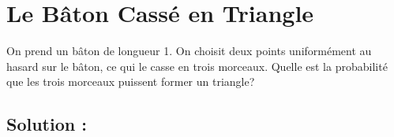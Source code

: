 












\section{Le Bâton Cassé en Triangle}

\begin{exerciseBox}
On prend un bâton de longueur 1. On choisit deux points uniformément au hasard sur le bâton, ce qui le casse en trois morceaux. Quelle est la probabilité que les trois morceaux puissent former un triangle?
\end{exerciseBox}



\subsection*{Solution :}


